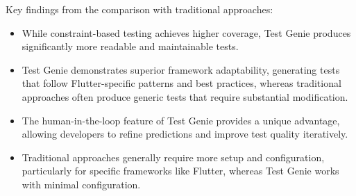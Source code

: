 \begin{table}[ht]
    \centering
    \caption{Comparison with Traditional Test Generation Approaches}
    \label{tab:traditional-comparison}
\end{table}

Key findings from the comparison with traditional approaches:

\begin{itemize}
    \item While constraint-based testing achieves higher coverage, Test Genie produces significantly more readable and maintainable tests.
    
    \item Test Genie demonstrates superior framework adaptability, generating tests that follow Flutter-specific patterns and best practices, whereas traditional approaches often produce generic tests that require substantial modification.
    
    \item The human-in-the-loop feature of Test Genie provides a unique advantage, allowing developers to refine predictions and improve test quality iteratively.
    
    \item Traditional approaches generally require more setup and configuration, particularly for specific frameworks like Flutter, whereas Test Genie works with minimal configuration.
\end{itemize}

